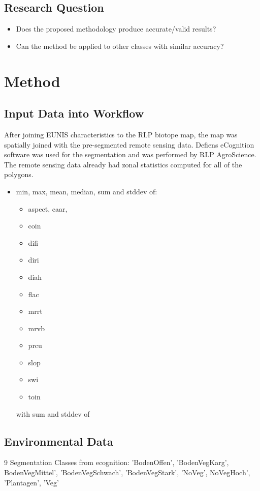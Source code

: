 \documentclass[a4paper,12pt]{article}
\begin{document}
\subsection{Research Question}
\begin{itemize}
  \item Does the proposed methodology produce accurate/valid results?
  \item Can the method be applied to other classes with similar accuracy?
\end{itemize}
\section{Method}
\subsection{Input Data into Workflow}
After joining EUNIS characteristics to the RLP biotope map, the map was 
spatially joined with the pre-segmented remote sensing data. Defiens eCognition
software was used for the segmentation and was performed by RLP AgroScience. 
The remote sensing data already had zonal statistics computed for all of the
polygons.
\begin{itemize}
  \item min, max, mean, median, sum and stddev of:
  \begin{itemize}
    \item aspect, caar,
	\item coin
	\item difi
	\item diri
	\item diah
	\item flac
	\item mrrt
	\item mrvb
	\item prcu
	\item slop
	\item swi
	\item toin
  \end{itemize}with  sum and stddev of 
\end{itemize}


\subsection{Environmental Data}

9 Segmentation Classes from ecognition:
'BodenOffen', 'BodenVegKarg', BodenVegMittel', 'BodenVegSchwach',
'BodenVegStark', 'NoVeg', NoVegHoch', 'Plantagen', 'Veg'
\end{document}
